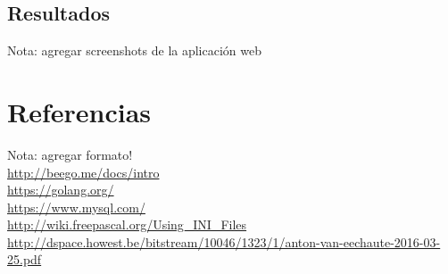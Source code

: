 \documentclass[12pt]{article}
\begin{document}
\subsection{Resultados}
Nota: agregar screenshots de la aplicación web
\section{Referencias}
Nota: agregar formato!\\
\noindent
\url{http://beego.me/docs/intro} \\
\url{https://golang.org/}\\
\url{https://www.mysql.com/} \\
\url{http://wiki.freepascal.org/Using_INI_Files} \\
\url{http://dspace.howest.be/bitstream/10046/1323/1/anton-van-eechaute-2016-03-25.pdf}
\end{document}
